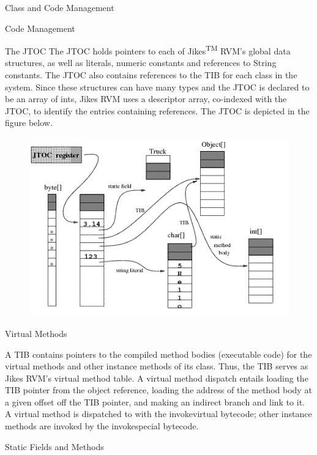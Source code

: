 \begin{section}{Class and Code Management}
\begin{subsection}{Code Management}
\begin{subsubsection}{The JTOC}
The JTOC holds pointers to each of Jikes\textsuperscript{TM} RVM's global data structures, as well as literals, numeric constants and references to String constants. The JTOC also contains references to the TIB for each class in the system. Since these structures can have many types and the JTOC is declared to be an array of ints, Jikes RVM uses a descriptor array, co-indexed with the JTOC, to identify the entries containing references. The JTOC is depicted in the figure below.

\begin{figure}[h]
  \centering
  \includegraphics[width=\linewidth]{images/ClassAndCodeManagement-JTOC.png}
\end{figure}

\end{subsubsection}

\begin{subsubsection}{Virtual Methods}

A TIB contains pointers to the compiled method bodies (executable code) for the virtual methods and other instance methods of its class. Thus, the TIB serves as Jikes RVM's virtual method table. A virtual method dispatch entails loading the TIB pointer from the object reference, loading the address of the method body at a given offset off the TIB pointer, and making an indirect branch and link to it. A virtual method is dispatched to with the invokevirtual bytecode; other instance methods are invoked by the invokespecial bytecode.

\end{subsubsection}

\begin{subsubsection}{Static Fields and Methods}


\end{subsubsection}
\end{subsection}
\end{section}

